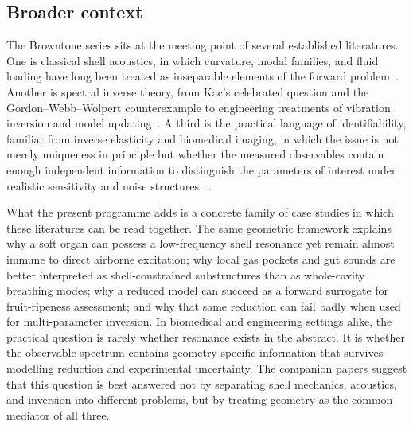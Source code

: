 \subsection{Broader context}

The Browntone series sits at the meeting point of several established
literatures.  One is classical shell acoustics, in which curvature, modal
families, and fluid loading have long been treated as inseparable elements of
the forward problem~\cite{Love1927,Leissa1973,Soedel2004,Junger1986}.  Another
is spectral inverse theory, from Kac's celebrated question and the
Gordon--Webb--Wolpert counterexample to engineering treatments of vibration
inversion and model updating~\cite{Kac1966,Gordon1992,Gladwell2004,Gladwell2005,
MottersheadFriswell1993,FriswellMottershead1995}.  A third is the practical
language of identifiability, familiar from inverse elasticity and biomedical
imaging, in which the issue is not merely uniqueness in principle but whether
the measured observables contain enough independent information to distinguish
the parameters of interest under realistic sensitivity and noise structures
~\cite{Raue2009,Doyley2012,parker2011imaging,Sack2023}.

What the present programme adds is a concrete family of case studies in which
these literatures can be read together.  The same geometric framework explains
why a soft organ can possess a low-frequency shell resonance yet remain almost
immune to direct airborne excitation; why local gas pockets and gut sounds are
better interpreted as shell-constrained substructures than as whole-cavity
breathing modes; why a reduced model can succeed as a forward surrogate for
fruit-ripeness assessment; and why that same reduction can fail badly when used
for multi-parameter inversion.  In biomedical and engineering settings alike,
the practical question is rarely whether resonance exists in the abstract.  It
is whether the observable spectrum contains geometry-specific information that
survives modelling reduction and experimental uncertainty.  The companion
papers suggest that this question is best answered not by separating shell
mechanics, acoustics, and inversion into different problems, but by treating
geometry as the common mediator of all three.
